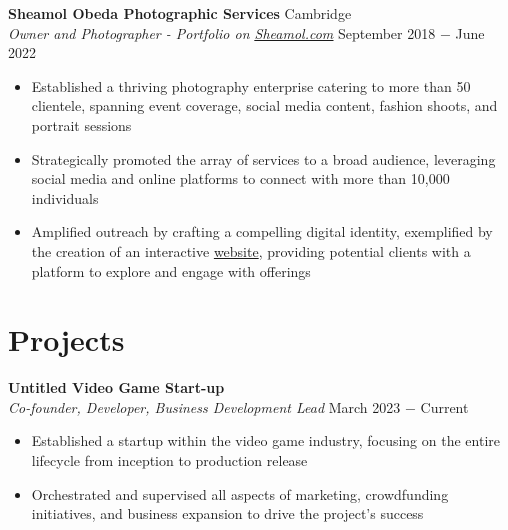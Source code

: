 \documentclass{article}
\begin{document}
\textbf{Sheamol Obeda Photographic Services} \hfill Cambridge\\
\textit{Owner and Photographer - Portfolio on \href{www.sheamol.com}{\underline{Sheamol.com}}} \hfill September 2018 $-$ June 2022
\begin{itemize}
    \item Established a thriving photography enterprise catering to more than 50 clientele, spanning event coverage, social media content, fashion shoots, and portrait sessions
    \item Strategically promoted the array of services to a broad audience, leveraging social media and online platforms to connect with more than 10,000 individuals
    \item Amplified outreach by crafting a compelling digital identity, exemplified by the creation of an interactive \href{www.sheamol.com}{website}, providing potential clients with a platform to explore and engage with offerings
\end{itemize} \medskip


\vspace{-0.75\baselineskip}
\hrulefill
\vspace{-0.75\baselineskip}

\section*{Projects}

\textbf{Untitled Video Game Start-up}\\
\textit{Co-founder, Developer, Business Development Lead} \hfill March 2023 $-$ Current 
\begin{itemize}
    \item Established a startup within the video game industry, focusing on the entire lifecycle from inception to production release
    \item Orchestrated and supervised all aspects of marketing, crowdfunding initiatives, and business expansion to drive the project's success
\end{itemize} \medskip
\end{document}
